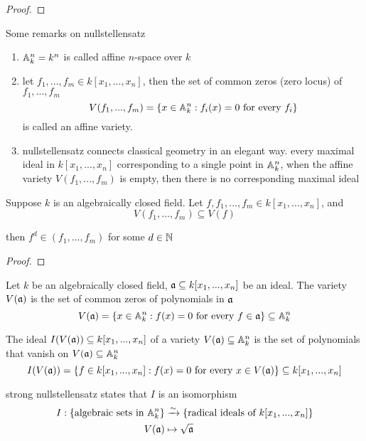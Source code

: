 \begin{proof}
\end{proof}



\begin{remark}
	Some remarks on nullstellensatz
	\begin{enumerate}
		\item $\mathbb{A}_k^n = k^n$ is called affine $n$-space over $k$
		\item let $f_1, ..., f_m \in k[x_1, ..., x_n]$, then the set of common zeros (zero locus) of $f_1, ..., f_m$
		$$
			V(f_1, ..., f_m) = \{x \in \mathbb{A}_k^n: f_i(x) = 0 \text{ for every } f_i\}
		$$
		is called an affine variety.
		\item nullstellensatz connects classical geometry in an elegant way. every maximal ideal in $k[x_1, ..., x_n]$ corresponding to a single point in $\mathbb{A}_k^n$, when the affine variety $V(f_1, ..., f_m)$ is empty, then there is no corresponding maximal ideal
	\end{enumerate}
\end{remark}

\begin{theorem}
	Suppose $k$ is an algebraically closed field. Let $f, f_1, ..., f_m \in k[x_1, ..., x_n]$, and
	$$
	V(f_1, ..., f_m) \subseteq V(f)
	$$
	
	then $f^d \in (f_1, ..., f_m)$ for some $d \in \mathbb{N}$
\end{theorem}

\begin{proof}
\end{proof}

\begin{remark}
	Let $k$ be an algebraically closed field, $\mathfrak{a} \subseteq k[x_1, ..., x_n]$ be an ideal. The variety $V(\mathfrak{a})$ is the set of common zeros of polynomials in $\mathfrak{a}$
	$$
		V(\mathfrak{a}) = \{x \in \mathbb{A}_k^n: f(x) = 0 \text{ for every } f \in \mathfrak{a}\} \subseteq \mathbb{A}_k^n
	$$
	
	The ideal $I(V(\mathfrak{a})) \subseteq k[x_1, ..., x_n]$ of a variety $V(\mathfrak{a}) \subseteq \mathbb{A}_k^n$ is the set of polynomials that vanish on $V(\mathfrak{a}) \subseteq \mathbb{A}_k^n$
	$$
		I(V(\mathfrak{a})) = \{f \in k[x_1, ..., x_n]: f(x) = 0 \text{ for every } x \in V(\mathfrak{a})\} \subseteq k[x_1, ..., x_n]
	$$
	
	strong nullstellensatz states that $I$ is an isomorphism
	\begin{align*}
		I: \{\text{algebraic sets in } \mathbb{A}_k^n\} &\xrightarrow{\sim} \{\text{radical ideals of } k[x_1, ..., x_n]\} \\
		V(\mathfrak{a}) &\mapsto \sqrt{\mathfrak{a}}
	\end{align*}
\end{remark}

